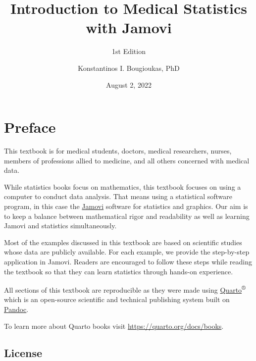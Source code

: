 \documentclass[
  16pt,
  letterpaper,
]{scrbook}
\title{Introduction to Medical Statistics with Jamovi}
\subtitle{1st Edition}
\author{Konstantinos I. Bougioukas, PhD}
\date{August 2, 2022}
\renewcommand*\contentsname{Table of contents}
\newcommand\contentsname{Table of contents}
\begin{document}
\frontmatter
\maketitle
\ifdefined\Shaded\renewenvironment{Shaded}{\begin{tcolorbox}[interior hidden, frame hidden, boxrule=0pt, borderline west={3pt}{0pt}{shadecolor}, breakable, sharp corners, enhanced]}{\end{tcolorbox}}\fi

\renewcommand*\contentsname{Table of contents}
{
\hypersetup{linkcolor=gray}
\setcounter{tocdepth}{1}
\tableofcontents
}
\listoffigures
\listoftables
{}
\mainmatter
{}

\hypertarget{preface}{%
\chapter*{Preface}\label{preface}}

This textbook is for medical students, doctors, medical researchers,
nurses, members of professions allied to medicine, and all others
concerned with medical data.

While statistics books focus on mathematics, this textbook focuses on
using a computer to conduct data analysis. That means using a
statistical software program, in this case the
\href{https://www.jamovi.org/}{Jamovi} software for statistics and
graphics. Our aim is to keep a balance between mathematical rigor and
readability as well as learning Jamovi and statistics simultaneously.

Most of the examples discussed in this textbook are based on scientific
studies whose data are publicly available. For each example, we provide
the step-by-step application in Jamovi. Readers are encouraged to follow
these steps while reading the textbook so that they can learn statistics
through hands-on experience.

All sections of this textbook are reproducible as they were made using
\href{https://quarto.org/}{Quarto}\textsuperscript{®} which is an
open-source scientific and technical publishing system built on
\href{https://pandoc.org/}{Pandoc}.

To learn more about Quarto books visit
\url{https://quarto.org/docs/books}.

\hypertarget{license}{%
\section*{License}\label{license}}
\end{document}
